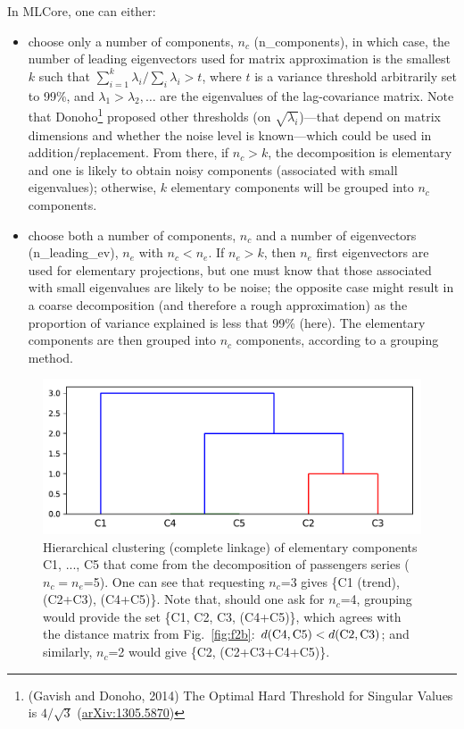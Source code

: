 \documentclass{article}
\begin{document}
In MLCore, one can either:
\begin{itemize}
  \item choose only a number of components, $n_c$ ({\selectfont n\_components}), in which case, the number of leading eigenvectors used for matrix approximation is the smallest $k$ such that $\sum_{i=1}^{k}\lambda_i / \sum_{i}\lambda_i>t$, where $t$ is a variance threshold arbitrarily set to 99\%, and $\lambda_1>\lambda_2,\dots$ are the eigenvalues of the lag-covariance matrix. Note that Donoho\footnote{(Gavish and Donoho, 2014) The Optimal Hard Threshold for Singular Values is $4/\sqrt{3}$ (\href{https://www.arxiv.org/abs/1305.5870}{arXiv:1305.5870})} proposed other thresholds (on $\sqrt{\lambda_i}$)---that depend on matrix dimensions and whether the noise level is known---which could be used in addition/replacement. From there, if $n_c>k$, the decomposition is elementary and one is likely to obtain noisy components (associated with small eigenvalues); otherwise, $k$ elementary components will be grouped into $n_c$ components.
  \item choose both a number of components, $n_c$ and a number of eigenvectors ({\selectfont n\_leading\_ev}), $n_e$ with $n_c<n_e$. If $n_e>k$, then $n_e$ first eigenvectors are used for elementary projections, but one must know that those associated with small eigenvalues are likely to be noise; the opposite case might result in a coarse decomposition (and therefore a rough approximation) as the proportion of variance explained is less that 99\% (here). The elementary components are then grouped into $n_c$ components, according to a grouping method.
\end{itemize}



\begin{figure}
  \centering
  \includegraphics[scale=0.4]{figures/fig3}
  \caption{Hierarchical clustering (complete linkage) of elementary components C1, ..., C5 that come from the decomposition of passengers series ($n_c=n_e$=5). One can see that requesting $n_c$=3 gives \{C1 (trend), (C2+C3), (C4+C5)\}. Note that, should one ask for $n_c$=4, grouping would provide the set \{C1, C2, C3, (C4+C5)\}, which agrees with the distance matrix from Fig.~\ref{fig:f2b}: $d(\textmd{C4}, \textmd{C5})<d(\textmd{C2}, \textmd{C3})$; and similarly, $n_c$=2 would give \{C2, (C2+C3+C4+C5)\}.}
  \label{fig:f2}
\end{figure}
\end{document}
